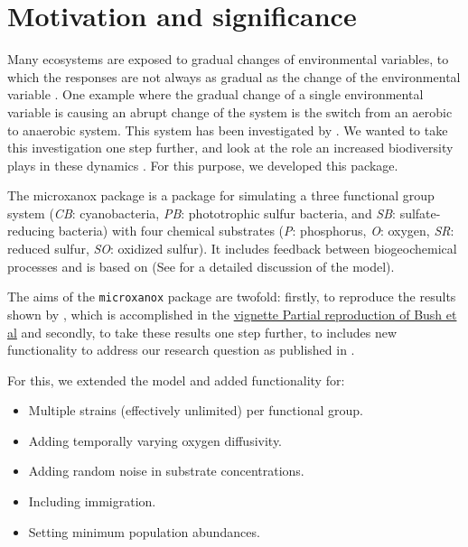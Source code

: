 \documentclass[]{elsarticle} %
\providecommand{\tightlist}{%
  \setlength{\itemsep}{0pt}\setlength{\parskip}{0pt}}
\begin{document}
\hypertarget{motivation-and-significance}{%
\section{Motivation and
significance}\label{motivation-and-significance}}

Many ecosystems are exposed to gradual changes of environmental
variables, to which the responses are not always as gradual as the
change of the environmental variable \citep{REF_NEEDED}. One example
where the gradual change of a single environmental variable is causing
an abrupt change of the system is the switch from an aerobic to
anaerobic system. This system has been investigated by \citet{Bush2017}.
We wanted to take this investigation one step further, and look at the
role an increased biodiversity plays in these dynamics
\citep{REF_NEEDED}. For this purpose, we developed this package.

The microxanox package is a package for simulating a three functional
group system (\emph{CB}: cyanobacteria, \emph{PB}: phototrophic sulfur
bacteria, and \emph{SB}: sulfate-reducing bacteria) with four chemical
substrates (\emph{P}: phosphorus, \emph{O}: oxygen, \emph{SR}: reduced
sulfur, \emph{SO}: oxidized sulfur). It includes feedback between
biogeochemical processes and is based on \citep{Bush2017} (See
\citep{Bush2017} for a detailed discussion of the model).

The aims of the \texttt{microxanox} package are twofold: firstly, to
reproduce the results shown by \citep{Bush2017}, which is accomplished
in the \href{LINK\%20NEEDED}{vignette Partial reproduction of Bush et
al} and secondly, to take these results one step further, to includes
new functionality to address our research question as published in
\citep{REF_NEEDED}.

For this, we extended the model and added functionality for:

\begin{itemize}
\tightlist
\item
  Multiple strains (effectively unlimited) per functional group.
\item
  Adding temporally varying oxygen diffusivity.
\item
  Adding random noise in substrate concentrations.
\item
  Including immigration.
\item
  Setting minimum population abundances.
\end{itemize}
\end{document}
